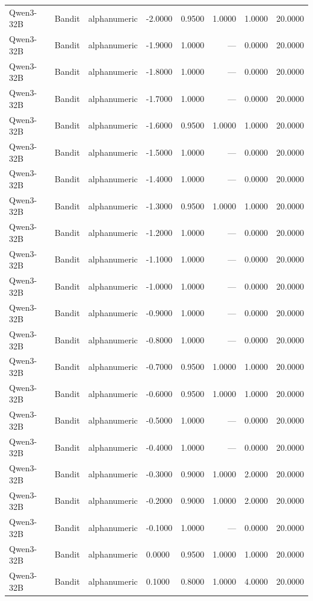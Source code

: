 \begin{table}
\begin{tabular}{llllrrrr}
Qwen3-32B & Bandit & alphanumeric & -2.0000 & 0.9500 & 1.0000 & 1.0000 & 20.0000 \\
Qwen3-32B & Bandit & alphanumeric & -1.9000 & 1.0000 & --- & 0.0000 & 20.0000 \\
Qwen3-32B & Bandit & alphanumeric & -1.8000 & 1.0000 & --- & 0.0000 & 20.0000 \\
Qwen3-32B & Bandit & alphanumeric & -1.7000 & 1.0000 & --- & 0.0000 & 20.0000 \\
Qwen3-32B & Bandit & alphanumeric & -1.6000 & 0.9500 & 1.0000 & 1.0000 & 20.0000 \\
Qwen3-32B & Bandit & alphanumeric & -1.5000 & 1.0000 & --- & 0.0000 & 20.0000 \\
Qwen3-32B & Bandit & alphanumeric & -1.4000 & 1.0000 & --- & 0.0000 & 20.0000 \\
Qwen3-32B & Bandit & alphanumeric & -1.3000 & 0.9500 & 1.0000 & 1.0000 & 20.0000 \\
Qwen3-32B & Bandit & alphanumeric & -1.2000 & 1.0000 & --- & 0.0000 & 20.0000 \\
Qwen3-32B & Bandit & alphanumeric & -1.1000 & 1.0000 & --- & 0.0000 & 20.0000 \\
Qwen3-32B & Bandit & alphanumeric & -1.0000 & 1.0000 & --- & 0.0000 & 20.0000 \\
Qwen3-32B & Bandit & alphanumeric & -0.9000 & 1.0000 & --- & 0.0000 & 20.0000 \\
Qwen3-32B & Bandit & alphanumeric & -0.8000 & 1.0000 & --- & 0.0000 & 20.0000 \\
Qwen3-32B & Bandit & alphanumeric & -0.7000 & 0.9500 & 1.0000 & 1.0000 & 20.0000 \\
Qwen3-32B & Bandit & alphanumeric & -0.6000 & 0.9500 & 1.0000 & 1.0000 & 20.0000 \\
Qwen3-32B & Bandit & alphanumeric & -0.5000 & 1.0000 & --- & 0.0000 & 20.0000 \\
Qwen3-32B & Bandit & alphanumeric & -0.4000 & 1.0000 & --- & 0.0000 & 20.0000 \\
Qwen3-32B & Bandit & alphanumeric & -0.3000 & 0.9000 & 1.0000 & 2.0000 & 20.0000 \\
Qwen3-32B & Bandit & alphanumeric & -0.2000 & 0.9000 & 1.0000 & 2.0000 & 20.0000 \\
Qwen3-32B & Bandit & alphanumeric & -0.1000 & 1.0000 & --- & 0.0000 & 20.0000 \\
Qwen3-32B & Bandit & alphanumeric & 0.0000 & 0.9500 & 1.0000 & 1.0000 & 20.0000 \\
Qwen3-32B & Bandit & alphanumeric & 0.1000 & 0.8000 & 1.0000 & 4.0000 & 20.0000 \\

\end{tabular}
\end{table}
